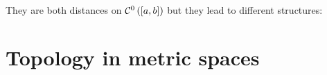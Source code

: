 They are both distances on $\mathcal{C}^0\left( [a,b] \right)$ but they lead to different structures:


\newpage

\section{Topology in metric spaces} %
\label{sec:topology_in_metric_spaces}











